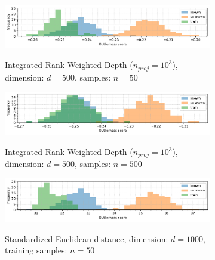 \begin{figure}[t]
    \centering
    \begin{subfigure}[b]{\textwidth}
        \centering
        \caption{\small Integrated Rank Weighted Depth ({\scriptsize$n_{proj} = 10^3$}), dimension: $d = 500$, samples: $n = 50$}
        \includegraphics[width=\textwidth]{images/distributions/hists-extreme/hist-distributions-dimension_500-samples_50-distance_8-distribution_uniform-model_IRWD-1000-seed_0.pdf}
        \label{fig:hists-irwd-n50}
    \end{subfigure}
    \begin{subfigure}[b]{\textwidth}
        \centering
        \caption{\small Integrated Rank Weighted Depth ({\scriptsize$n_{proj} = 10^3$}), dimension: $d = 500$, samples: $n = 500$}
        \includegraphics[width=\textwidth]{images/distributions/hists-extreme/hist-distributions-dimension_500-samples_500-distance_8-distribution_uniform-model_IRWD-1000-seed_0.pdf}
        \label{fig:hists-irwd-n500}
    \end{subfigure}
    \begin{subfigure}[b]{\textwidth}
        \centering
        \caption{\small Standardized Euclidean distance, dimension: $d = 1000$, training samples: $n = 50$}
        \includegraphics[width=\textwidth]{images/distributions/hists-extreme/hist-distributions-dimension_1000-samples_50-distance_8-distribution_uniform-model_SED-seed_0.pdf}
        \label{fig:hists-sed-n50}
    \end{subfigure}
    \begin{subfigure}[b]{\textwidth}

\end{subfigure}
\end{figure}
